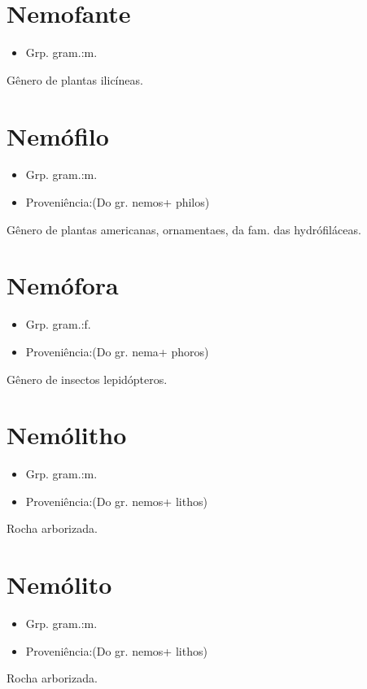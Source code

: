 \section{Nemofante}
\begin{itemize}
\item {Grp. gram.:m.}
\end{itemize}
Gênero de plantas ilicíneas.
\section{Nemófilo}
\begin{itemize}
\item {Grp. gram.:m.}
\end{itemize}
\begin{itemize}
\item {Proveniência:(Do gr. \textunderscore nemos\textunderscore  + \textunderscore philos\textunderscore )}
\end{itemize}
Gênero de plantas americanas, ornamentaes, da fam. das hydrófiláceas.
\section{Nemófora}
\begin{itemize}
\item {Grp. gram.:f.}
\end{itemize}
\begin{itemize}
\item {Proveniência:(Do gr. \textunderscore nema\textunderscore  + \textunderscore phoros\textunderscore )}
\end{itemize}
Gênero de insectos lepidópteros.
\section{Nemólitho}
\begin{itemize}
\item {Grp. gram.:m.}
\end{itemize}
\begin{itemize}
\item {Proveniência:(Do gr. \textunderscore nemos\textunderscore  + \textunderscore lithos\textunderscore )}
\end{itemize}
Rocha arborizada.
\section{Nemólito}
\begin{itemize}
\item {Grp. gram.:m.}
\end{itemize}
\begin{itemize}
\item {Proveniência:(Do gr. \textunderscore nemos\textunderscore  + \textunderscore lithos\textunderscore )}
\end{itemize}
Rocha arborizada.
